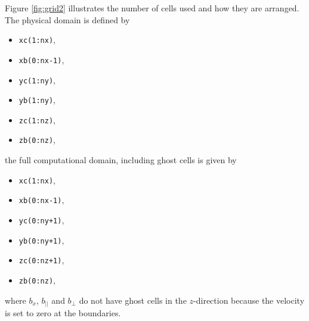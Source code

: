 \documentclass{article}
\begin{document}
Figure \ref{fig:grid2} illustrates the number of cells used and how they are arranged. The physical domain is defined by
\begin{itemize}
    \item \texttt{xc(1:nx)},
    \item \texttt{xb(0:nx-1)},
    \item \texttt{yc(1:ny)},
    \item \texttt{yb(1:ny)},
    \item \texttt{zc(1:nz)},
    \item \texttt{zb(0:nz)},
\end{itemize}
the full computational domain, including ghost cells is given by
\begin{itemize}
    \item \texttt{xc(1:nx)},
    \item \texttt{xb(0:nx-1)},
    \item \texttt{yc(0:ny+1)},
    \item \texttt{yb(0:ny+1)},
    \item \texttt{zc(0:nz+1)},
    \item \texttt{zb(0:nz)},
\end{itemize}
where $b_x$, $b_{||}$ and $b_{\perp}$ do not have ghost cells in the $z$-direction because the velocity is set to zero at the boundaries.
\end{document}
